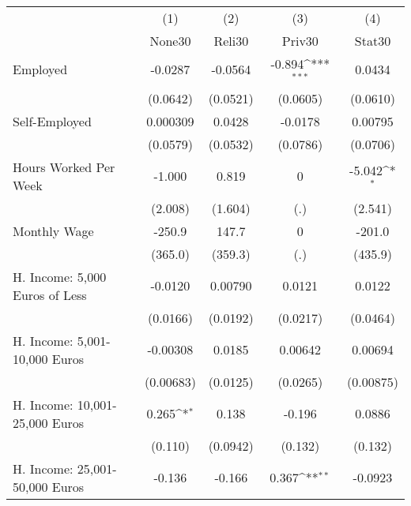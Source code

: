 {
\def\sym#1{\ifmmode^{#1}\else\(^{#1}\)\fi}
\begin{tabular}{l*{4}{c}}
\hline\hline
            &\multicolumn{1}{c}{(1)}&\multicolumn{1}{c}{(2)}&\multicolumn{1}{c}{(3)}&\multicolumn{1}{c}{(4)}\\
            &\multicolumn{1}{c}{None30}&\multicolumn{1}{c}{Reli30}&\multicolumn{1}{c}{Priv30}&\multicolumn{1}{c}{Stat30}\\
\hline
Employed    &     -0.0287         &     -0.0564         &      -0.894\sym{***}&      0.0434         \\
            &    (0.0642)         &    (0.0521)         &    (0.0605)         &    (0.0610)         \\
[1em]
Self-Employed&    0.000309         &      0.0428         &     -0.0178         &     0.00795         \\
            &    (0.0579)         &    (0.0532)         &    (0.0786)         &    (0.0706)         \\
[1em]
Hours Worked Per Week&      -1.000         &       0.819         &           0         &      -5.042\sym{*}  \\
            &     (2.008)         &     (1.604)         &         (.)         &     (2.541)         \\
[1em]
Monthly Wage&      -250.9         &       147.7         &           0         &      -201.0         \\
            &     (365.0)         &     (359.3)         &         (.)         &     (435.9)         \\
[1em]
H. Income: 5,000 Euros of Less&     -0.0120         &     0.00790         &      0.0121         &      0.0122         \\
            &    (0.0166)         &    (0.0192)         &    (0.0217)         &    (0.0464)         \\
[1em]
H. Income: 5,001-10,000 Euros&    -0.00308         &      0.0185         &     0.00642         &     0.00694         \\
            &   (0.00683)         &    (0.0125)         &    (0.0265)         &   (0.00875)         \\
[1em]
H. Income: 10,001-25,000 Euros&       0.265\sym{*}  &       0.138         &      -0.196         &      0.0886         \\
            &     (0.110)         &    (0.0942)         &     (0.132)         &     (0.132)         \\
[1em]
H. Income: 25,001-50,000 Euros&      -0.136         &      -0.166         &       0.367\sym{**} &     -0.0923         \\

\end{tabular}}
